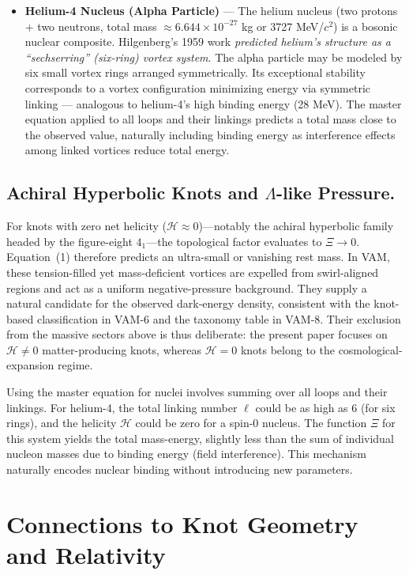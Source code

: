\documentclass[11pt]{article}
\begin{document}
\begin{itemize}
        \item \textbf{Helium-4 Nucleus (Alpha Particle)} — The helium nucleus (two protons + two neutrons, total mass $\approx 6.644 \times 10^{-27}$ kg or 3727 MeV/$c^2$) is a bosonic nuclear composite. Hilgenberg’s 1959 work \textit{predicted helium’s structure as a “sechserring” (six-ring) vortex system}. The alpha particle may be modeled by six small vortex rings arranged symmetrically. Its exceptional stability corresponds to a vortex configuration minimizing energy via symmetric linking — analogous to helium-4’s high binding energy (28 MeV). The master equation applied to all loops and their linkings predicts a total mass close to the observed value, naturally including binding energy as interference effects among linked vortices reduce total energy.
    \end{itemize}


    \subsection{Achiral Hyperbolic Knots and $\Lambda$-like Pressure.}
         For knots with zero net helicity ($\mathcal{H} \approx 0$)—notably the achiral hyperbolic family headed by the figure-eight $4_1$—the topological factor evaluates to $\Xi \to 0$. Equation~(1) therefore predicts an ultra-small or vanishing rest mass. In VAM, these tension-filled yet mass-deficient vortices are expelled from swirl-aligned regions and act as a uniform negative-pressure background. They supply a natural candidate for the observed dark-energy density, consistent with the knot-based classification in VAM-6 and the taxonomy table in VAM-8. Their exclusion from the massive sectors above is thus deliberate: the present paper focuses on $\mathcal{H} \neq 0$ matter-producing knots, whereas $\mathcal{H} = 0$ knots belong to the cosmological-expansion regime.


    Using the master equation for nuclei involves summing over all loops and their linkings. For helium-4, the total linking number $\ell$ could be as high as 6 (for six rings), and the helicity $\mathcal{H}$ could be zero for a spin-0 nucleus. The function $\Xi$ for this system yields the total mass-energy, slightly less than the sum of individual nucleon masses due to binding energy (field interference). This mechanism naturally encodes nuclear binding without introducing new parameters.

    \section{Connections to Knot Geometry and Relativity}
\end{document}
